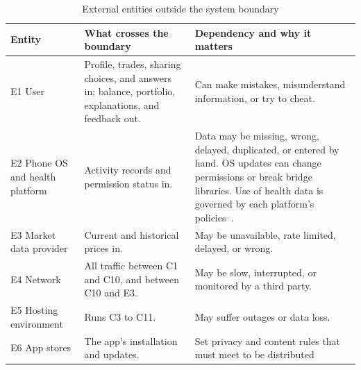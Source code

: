 \documentclass{article}
\begin{document}
\begin{table}[H]
  \caption{External entities outside the system boundary} \label{TblExternal}
  \small
  \begin{tabularx}{\textwidth}{>{\raggedright\arraybackslash}p{}
    X X}
    \toprule
    \textbf{Entity}                            & \textbf{What crosses the boundary}                                      & \textbf{Dependency
    and why it matters}                                                                                                                                                \\
    \midrule
    E1 User                                    & Profile, trades, sharing choices, and answers in; balance,
    portfolio, explanations, and feedback out. & Can make mistakes, misunderstand
    information, or try to cheat.                                                                                                                                      \\
    E2 Phone OS and health platform            & Activity records and permission status in.
                                               & Data may be missing, wrong, delayed, duplicated, or entered by hand. OS
    updates can change permissions or break bridge libraries. Use of health data is
    governed by each platform's policies~\cite{AppleReview, GoogleHealthConnect}.                                                                                      \\
    E3 Market data provider                    & Current and historical prices in.                                       & May be
    unavailable, rate limited, delayed, or wrong.                                                                                                                      \\
    E4 Network                                 & All traffic between C1 and C10, and between C10 and E3.                 & May be
    slow, interrupted, or monitored by a third party.                                                                                                                  \\
    E5 Hosting environment                     & Runs C3 to C11.                                                         & May suffer outages or data loss.            \\
    E6 App stores                              & The app's installation and updates.                                     & Set privacy and content
    rules that \progname{} must meet to be distributed~\cite{AppleReview,
}
\end{tabularx}
\end{table}
\end{document}

